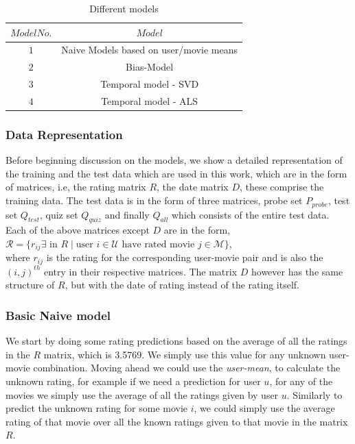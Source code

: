 \begin{table}
\centering 
\begin{tabular}{|c|c|} \hline %
$Model No.$ & $Model$   \\ 
\hline
$ 1$
& Naive Models based on user/movie means  \\ %
$ 2$
& Bias-Model\\ %
$ 3$
& Temporal model - SVD  \\ %
$ 4$
& Temporal model - ALS  \\ \hline
\end{tabular}
\caption{Different models}
\label{tab:Models}
\end{table}


\subsubsection{Data Representation}
Before beginning discussion on the models, we show a detailed representation of
the training and the test data which are used in this work, which are in the
form of matrices, i.e, the rating matrix $R$, the date matrix $D$,
these comprise the training data. The test data is in the form of three
matrices, probe set $P_{probe}$, test set $Q_{test}$, quiz set
$Q_{quiz}$ and finally $Q_{all}$ which consists of the entire test
data. Each of the above matrices except $D$ are in the form,  \\
$\mathcal{R} = \{r_{ij} \exists \mbox{ in } R \mid \mbox{user } i \in
\mathcal{U} \mbox{ have rated movie } j \in \mathcal{M} \}$, \\
where $r_{ij}$ is the rating for the corresponding user-movie pair and is also
the $(i,j)^{th}$ entry in their respective matrices. The matrix $D$ however
has the same structure of $R$, but with the date of rating instead of the
rating itself.

\subsubsection{Basic Naive model} We start by doing some rating predictions
based on the average of all the ratings in the $R$ matrix, which is 3.5769. We
simply use this value for any unknown user-movie combination. Moving ahead we
could use the \emph{user-mean}, to calculate the unknown rating, for example if
we need a prediction for user $u$, for any of the movies we simply use the
average of all the ratings given by user $u$. Similarly to predict the unknown
rating for some movie $i$, we could simply use the average rating of that movie
over all the known ratings given to that movie in the matrix $R$.  
